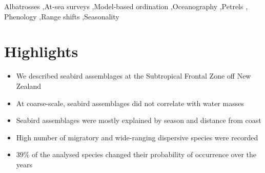 \documentclass[preprint, 3p, authoryear]{elsarticle} %
\begin{document}
\begin{frontmatter}
  \begin{abstract}
  Understanding the relationships between organisms and their environment is crucial to determining important areas for conservation and monitoring. In rapidly changing oceans, one approach to quantify these relationships is to identify species assemblages. This study used a nine year dataset of seabird observations sampled approximately every two months during a cross-shelf transect to describe assemblages at the Subtropical Frontal Zone, in southeast Aotearoa/New Zealand. During 36 voyages, 47 species and a minimum of 69,025 individual birds were recorded. We used multivariate, model-based ordinations to identify assemblages against spatial (distance from the coast), temporal (season) and environmental (water mass) predictors. The multivariate models suggest that the distance from the coast and seasons explain most of the observed variability. Gulls and shags influenced a coastal assemblage (<25 km from the coast), and most albatrosses and petrels were only recorded offshore (>35 km). Seasons strongly influenced the assemblages, with 31 of the 39 analysed species classified as migratory or dispersive. Over the nine year dataset, the probability of occurrence of nearly 40\% of the analysed species changed, indicating possible changes in the assemblage structure and species ranges. This study shows the importance of accounting for seasonality when describing assemblages in regions supporting high proportions of migratory and/or wide-ranging species. The observed changes in the probability of occurrence of several species may be the first evidence for the effects of oceanographic changes recently described for the southwest Pacific Ocean due to above-average warming caused by climate change.
  \end{abstract}
  \begin{keyword}
    Albatrosses \sep At-sea surveys \sep Model-based ordination \sep Oceanography \sep Petrels \sep 
    Phenology \sep Range shifts \sep Seasonality
  \end{keyword}
  
 \end{frontmatter}

\hypertarget{highlights}{%
\section*{Highlights}\label{highlights}}

\begin{itemize}
\item
  We described seabird assemblages at the Subtropical Frontal Zone off New Zealand
\item
  At coarse-scale, seabird assemblages did not correlate with water masses
\item  
  Seabird assemblages were mostly explained by season and distance from coast
\item
  High number of migratory and wide-ranging dispersive species were recorded
\item
  39\% of the analysed species changed their probability of occurrence over the years
\end{itemize}
\end{document}
